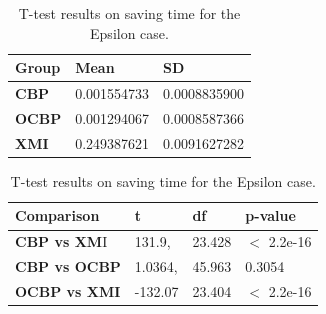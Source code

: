 \documentclass{llncs}
\begin{document}
\begin{table}[ht]
    \centering
    \label{table:ttest_save_time_epsilon}
    \caption{T-test results on saving time for the Epsilon case.}
    \begin{minipage}{0.44\textwidth}
        \centering
        \begin{tabular}{|p{}|p{}|p{}|}
            \hline 
            \textbf{Group}  & \textbf{Mean} & \textbf{SD} \\ 
            \hline 
            \textbf{CBP} &0.001554733    &  0.0008835900 \\ 
            \hline 
            \textbf{OCBP} &  0.001294067  &  0.0008587366 \\ 
            \hline 
            \textbf{XMI} & 0.249387621   &0.0091627282 \\ 
            \hline 
        \end{tabular} 
    \end{minipage}
    \hfill
    \begin{minipage}{0.54\textwidth}
        \centering
        \begin{tabular}{|p{}|p{}|p{}|p{}|}
            \hline 
            \textbf{Comparison} & \textbf{t}  & \textbf{df} & \textbf{p-value} \\ 
            \hline 
            \textbf{CBP vs XM}I & 131.9,    & 23.428 & $<$ 2.2e-16 \\ 
            \hline 
            \textbf{CBP vs OCBP} &1.0364, & 45.963 & 0.3054 \\ 
            \hline 
            \textbf{OCBP vs XMI} & -132.07    &23.404  & $<$ 2.2e-16 \\ 
            \hline 
        \end{tabular} 
    \end{minipage}
\end{table}
\end{document}
